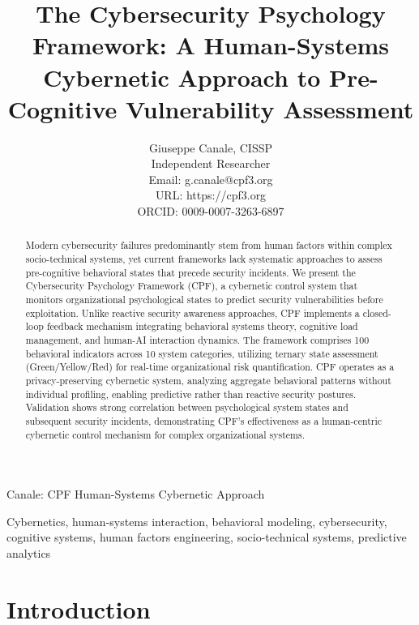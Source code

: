 \documentclass[journal]{IEEEtran}
\begin{document}
\title{The Cybersecurity Psychology Framework: A Human-Systems Cybernetic Approach to Pre-Cognitive Vulnerability Assessment}

\author{Giuseppe Canale, CISSP\\
Independent Researcher\\
Email: g.canale@cpf3.org\\
URL: https://cpf3.org\\
ORCID: 0009-0007-3263-6897}

%
{Canale: CPF Human-Systems Cybernetic Approach}

\maketitle

\begin{abstract}
Modern cybersecurity failures predominantly stem from human factors within complex socio-technical systems, yet current frameworks lack systematic approaches to assess pre-cognitive behavioral states that precede security incidents. We present the Cybersecurity Psychology Framework (CPF), a cybernetic control system that monitors organizational psychological states to predict security vulnerabilities before exploitation. Unlike reactive security awareness approaches, CPF implements a closed-loop feedback mechanism integrating behavioral systems theory, cognitive load management, and human-AI interaction dynamics. The framework comprises 100 behavioral indicators across 10 system categories, utilizing ternary state assessment (Green/Yellow/Red) for real-time organizational risk quantification. CPF operates as a privacy-preserving cybernetic system, analyzing aggregate behavioral patterns without individual profiling, enabling predictive rather than reactive security postures. Validation shows strong correlation between psychological system states and subsequent security incidents, demonstrating CPF's effectiveness as a human-centric cybernetic control mechanism for complex organizational systems.
\end{abstract}

\begin{IEEEkeywords}
Cybernetics, human-systems interaction, behavioral modeling, cybersecurity, cognitive systems, human factors engineering, socio-technical systems, predictive analytics
\end{IEEEkeywords}

\section{Introduction}
\end{document}
